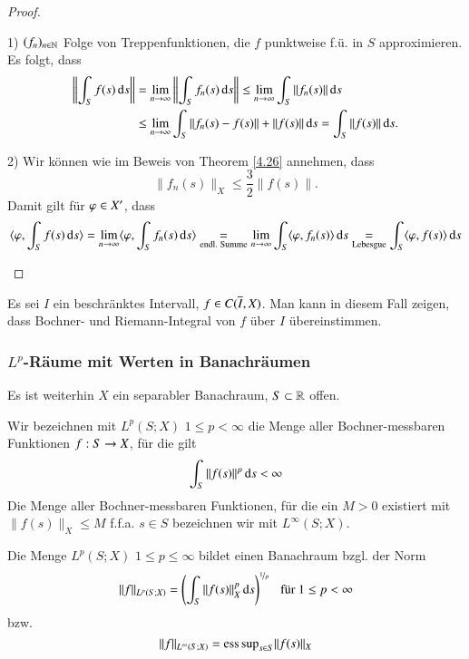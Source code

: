 \begin{proof}
    \begin{description}
    \item{1)}
    $(f_n)_{n\in \mathbb{N}}$ Folge von Treppenfunktionen, die $f$ punktweise f.ü. in $S$ approximieren.
    Es folgt, dass
    \begin{align*}
        \left\| \int_Sf(s)\, \mathrm{d} s\right\| &=\lim_{n\rightarrow\infty} \left\| \int_Sf_n(s) \, \mathrm{d} s\right\|
        \leq \lim_{n\rightarrow \infty} \int_S\|f_n(s)\| \, \mathrm{d} s\\
        &\leq \lim_{n\rightarrow \infty} \int_S \|f_n(s)-f(s)\| +\|f(s)\|\, \mathrm{d} s = \int_S \|f(s)\| \, \mathrm{d} s.
    \end{align*}
    \item{2)}
    Wir können wie im Beweis von Theorem \ref{4.26} annehmen, dass
    \[
        \|f_n(s)\|_X \leq \frac32 \|f(s)\|.
    \]
    Damit gilt für $\varphi \in X'$, dass
    \[
        \langle \varphi, \int_S f(s)\, \mathrm{d} s\rangle = \lim_{n\rightarrow \infty} \langle \varphi , \int_S f_n(s)\, \mathrm{d} s\rangle 
        \underset{\text{endl. Summe}}{=} \lim_{n\rightarrow \infty} \int_S \langle \varphi, f_n(s)\rangle \, \mathrm{d} s
        \underset{\text{Lebesgue}}{=} \int_S \langle \varphi, f(s)\rangle \, \mathrm{d} s
    \]
    \end{description}
    \[ \]
\end{proof}

\begin{remark}
    Es sei $I$ ein beschränktes Intervall, $f\in C(\overline I, X)$. Man kann in diesem Fall zeigen, dass
    Bochner- und Riemann-Integral von $f$ über $I$ übereinstimmen.
\end{remark}

\subsubsection*{$L^p$-Räume mit Werten in Banachräumen}

Es ist weiterhin $X$ ein separabler Banachraum, $S\subset \mathbb{R}$ offen.

\begin{defi}\label{4.28}
    Wir bezeichnen mit $L^p(S;X)$ $1\leq p<\infty$ die Menge aller Bochner-messbaren Funktionen
    $f:S\rightarrow X$, für die gilt
    \[
        \int_S \|f(s)\|^p \, \mathrm{d} s < \infty
    \]
    Die Menge aller Bochner-messbaren Funktionen, für die ein $M>0$ existiert mit $\|f(s)\|_X\leq M$ 
    f.f.a. $s\in S$ bezeichnen wir mit $L^\infty(S;X)$.
\end{defi}

\begin{theorem}\label{4.29}
    Die Menge $L^p(S;X)$ $1\leq p \leq \infty$ bildet einen Banachraum bzgl. der Norm
    \[
        \|f\|_{L^p(S;X)} = \left( \int_S \|f(s)\|_X^p\, \mathrm{d} s \right)^{\nicefrac1p} \hspace{.25cm} \text{für } 1\leq p 
        <\infty
    \]
    bzw. 
    \[
        \|f\|_{L^\infty(S;X)}=\mathrm{ess\, sup}_{s\in S} \|f(s)\|_X
    \]
\end{theorem}

